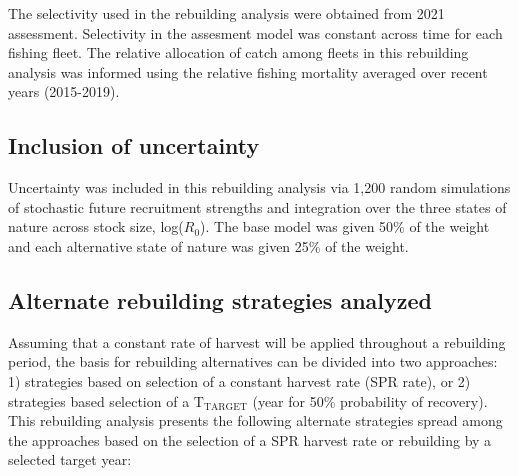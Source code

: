 \documentclass[11pt,
  english,
  a4paper,
]{article}
\begin{document}
The selectivity used in the rebuilding analysis were obtained from 2021 assessment. Selectivity in the assesment model was constant across time for each fishing fleet. The relative allocation of catch among fleets in this rebuilding analysis was informed using the relative fishing mortality averaged over recent years (2015-2019).

\leavevmode\tagmcend\tagstructend\par


\hypertarget{inclusion-of-uncertainty}{%
\subsection{Inclusion of uncertainty}\label{inclusion-of-uncertainty}}

\leavevmode\tagmcend\tagstructend


Uncertainty was included in this rebuilding analysis via 1,200 random simulations of stochastic future recruitment strengths and integration over the three states of nature across stock size, log({\(R_0\)\leavevmode\tagmcend\tagstructend}). The base model was given 50\% of the weight and each alternative state of nature was given 25\% of the weight.

\leavevmode\tagmcend\tagstructend\par


\hypertarget{alternate-rebuilding-strategies-analyzed}{%
\subsection{Alternate rebuilding strategies analyzed}\label{alternate-rebuilding-strategies-analyzed}}

\leavevmode\tagmcend\tagstructend


Assuming that a constant rate of harvest will be applied throughout a rebuilding period, the basis for rebuilding alternatives can be divided into two approaches: 1) strategies based on selection of a constant harvest rate (SPR rate), or 2) strategies based selection of a {\(\text{T}_\text{TARGET}\)\leavevmode\tagmcend\tagstructend} (year for 50\% probability of recovery). This rebuilding analysis presents the following alternate strategies spread among the approaches based on the selection of a SPR harvest rate or rebuilding by a selected target year:
\end{document}
